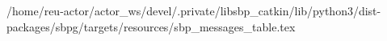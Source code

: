 /home/reu-actor/actor_ws/devel/.private/libsbp_catkin/lib/python3/dist-packages/sbpg/targets/resources/sbp_messages_table.tex